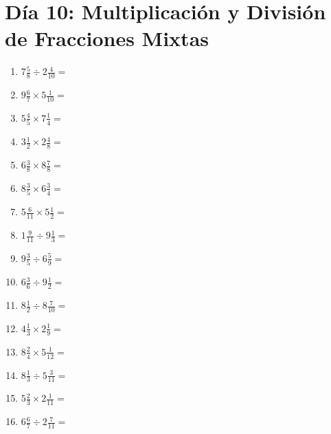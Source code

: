 \documentclass[12pt]{article}
\begin{document}
\section*{Día 10: Multiplicación y División de Fracciones Mixtas}
\begin{enumerate}
\item \large $ 7 \frac{5}{8} \div 2 \frac{4}{10} = $ \vspace{1.6cm}
\item \large $ 9 \frac{6}{7} \times 5 \frac{1}{10} = $ \vspace{1.6cm}
\item \large $ 5 \frac{4}{5} \times 7 \frac{1}{4} = $ \vspace{1.6cm}
\item \large $ 3 \frac{1}{2} \times 2 \frac{4}{8} = $ \vspace{1.6cm}
\item \large $ 6 \frac{3}{8} \times 8 \frac{7}{8} = $ \vspace{1.6cm}
\item \large $ 8 \frac{3}{5} \times 6 \frac{3}{4} = $ \vspace{1.6cm}
\item \large $ 5 \frac{6}{11} \times 5 \frac{1}{2} = $ \vspace{1.6cm}
\item \large $ 1 \frac{9}{11} \div 9 \frac{1}{3} = $ \vspace{1.6cm}
\item \large $ 9 \frac{3}{5} \div 6 \frac{5}{9} = $ \vspace{1.6cm}
\item \large $ 6 \frac{3}{6} \div 9 \frac{1}{2} = $ \vspace{1.6cm}
\newpage
\item \large $ 8 \frac{1}{2} \div 8 \frac{7}{10} = $ \vspace{1.6cm}
\item \large $ 4 \frac{1}{3} \times 2 \frac{1}{9} = $ \vspace{1.6cm}
\item \large $ 8 \frac{2}{4} \times 5 \frac{1}{12} = $ \vspace{1.6cm}
\item \large $ 8 \frac{1}{3} \div 5 \frac{3}{11} = $ \vspace{1.6cm}
\item \large $ 5 \frac{2}{3} \times 2 \frac{1}{11} = $ \vspace{1.6cm}
\item \large $ 6 \frac{6}{7} \div 2 \frac{7}{11} = $ \vspace{1.6cm}

\end{enumerate}
\end{document}
